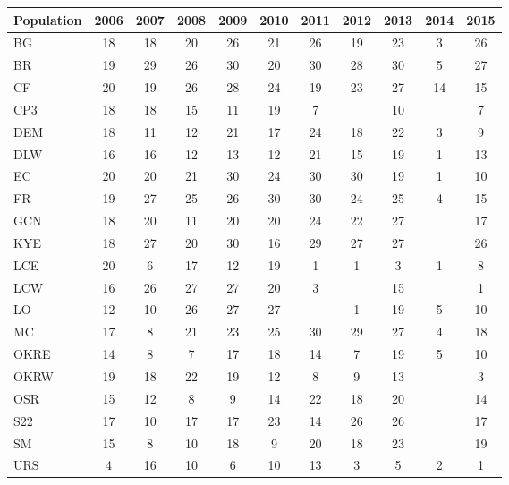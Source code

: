 \documentclass[12pt, oneside, titlepage]{article}   	%
\begin{document}
 \newpage
 

 \label{tab:sigma} 
\begin{table}[ht]
\centering
\begin{tabular}{lcccccccccc}
  \hline
Population & 2006 & 2007 & 2008 & 2009 & 2010 & 2011 & 2012 & 2013 & 2014 & 2015 \\ 
  \hline
BG &  18 &  18 &  20 &  26 &  21 &  26 &  19 &  23 &   3 &  26 \\ 
  BR &  19 &  29 &  26 &  30 &  20 &  30 &  28 &  30 &   5 &  27 \\ 
  CF &  20 &  19 &  26 &  28 &  24 &  19 &  23 &  27 &  14 &  15 \\ 
  CP3 &  18 &  18 &  15 &  11 &  19 &   7 &  &  10 &  &   7 \\ 
  DEM &  18 &  11 &  12 &  21 &  17 &  24 &  18 &  22 &   3 &   9 \\ 
  DLW &  16 &  16 &  12 &  13 &  12 &  21 &  15 &  19 &   1 &  13 \\ 
  EC &  20 &  20 &  21 &  30 &  24 &  30 &  30 &  19 &   1 &  10 \\ 
  FR &  19 &  27 &  25 &  26 &  30 &  30 &  24 &  25 &   4 &  15 \\ 
  GCN &  18 &  20 &  11 &  20 &  20 &  24 &  22 &  27 &  &  17 \\ 
  KYE &  18 &  27 &  20 &  30 &  16 &  29 &  27 &  27 &  &  26 \\ 
  LCE &  20 &   6 &  17 &  12 &  19 &   1 &   1 &   3 &   1 &   8 \\ 
  LCW &  16 &  26 &  27 &  27 &  20 &   3 &  &  15 &  &   1 \\ 
  LO &  12 &  10 &  26 &  27 &  27 &  &   1 &  19 &   5 &  10 \\ 
  MC &  17 &   8 &  21 &  23 &  25 &  30 &  29 &  27 &   4 &  18 \\ 
  OKRE &  14 &   8 &   7 &  17 &  18 &  14 &   7 &  19 &   5 &  10 \\ 
  OKRW &  19 &  18 &  22 &  19 &  12 &   8 &   9 &  13 &  &   3 \\ 
  OSR &  15 &  12 &   8 &   9 &  14 &  22 &  18 &  20 &  &  14 \\ 
  S22 &  17 &  10 &  17 &  17 &  23 &  14 &  26 &  26 &  &  17 \\ 
  SM &  15 &   8 &  10 &  18 &   9 &  20 &  18 &  23 &  &  19 \\ 
  URS &   4 &  16 &  10 &   6 &  10 &  13 &   3 &   5 &   2 &   1 \\ 
   \hline
\end{tabular}
\end{table}
 
\end{document}
